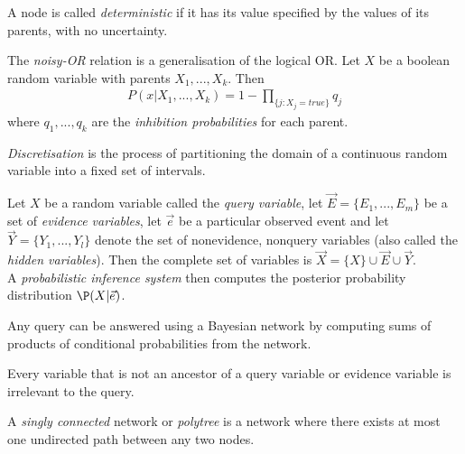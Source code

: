 \documentclass{article}
\begin{document}
\begin{definition}
    A node is called \emph{deterministic} if it has its value specified by the values
    of its parents, with no uncertainty.
\end{definition}

\begin{definition}
    The \emph{noisy-OR} relation is a generalisation of the logical OR. Let $X$ be a boolean
    random variable with parents $X_1, ..., X_k$. Then
    \begin{align*}
        P(x|X_1, ..., X_k) = 1 - \prod_{\{j:X_j = true\}} q_j
    \end{align*}
    where $q_1,...,q_k$ are the \emph{inhibition probabilities} for each parent.
\end{definition}

\begin{definition}
    \emph{Discretisation} is the process of partitioning the domain of a continuous
    random variable into a fixed set of intervals.
\end{definition}

\begin{definition}
    Let $X$ be a random variable called the \emph{query variable}, let $\vec E=\{E_1,...,E_m\}$
    be a set of \emph{evidence variables}, let $\vec e$ be a particular observed event and let
    $\vec Y=\{Y_1, ..., Y_l\}$ denote the set of nonevidence, nonquery variables (also
    called the \emph{hidden variables}). Then the complete set of variables is
    $\vec X = \{X\}\cup \vec E \cup \vec Y$.\\
    A \emph{probabilistic inference system} then computes the posterior probability distribution
    $\P(X|\vec e)$.
\end{definition}

\begin{theorem}
    Any query can be answered using a Bayesian network by computing sums of products of
    conditional probabilities from the network.
\end{theorem}

\begin{theorem}
    Every variable that is not an ancestor of a query variable or evidence variable is irrelevant
    to the query.
\end{theorem}

\begin{definition}
    A \emph{singly connected} network or \emph{polytree} is a network where there exists at most one
    undirected path between any two nodes.
\end{definition}
\end{document}
